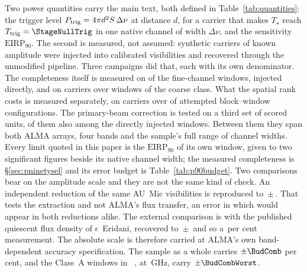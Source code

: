 Two power quantities carry the main text, both defined in
Table~\ref{tab:quantities}: the trigger level $P_{\rm trig} = 4\pi
d^{2}S\,\Delta\nu$ at distance $d$, for a carrier that makes $T_\star$ reach
$T_{\rm trig}=\StageNullTrig$ in one native channel of width $\Delta\nu$,
and the sensitivity $\mathrm{EIRP}_{90}$. The second is measured, not
assumed: synthetic carriers of known amplitude were injected into
calibrated visibilities and recovered through the unmodified pipeline.
Three campaigns did that, each with its own denominator. The completeness
itself is measured on
\MkInjCompWin{} of the \MkInjCompDenom{} fine-channel windows, injected
directly, and on \SensNToneCoarse{} carriers over \SensNInjCoarse{} windows
of the coarse class. What the spatial rank costs is measured separately, on
\SelNTone{} carriers over \MkInjSelUnit{} of \MkInjSelTotal{} attempted
block--window configurations. The primary-beam correction is tested on a
third set of \MkInjBeamUnit{} scored units, \MkInjBeamShared{} of them also
among the directly injected windows. Between them they span both ALMA
arrays, four bands and the sample's full range of
channel widths. Every limit quoted in
this paper is the $\mathrm{EIRP}_{90}$ of its own window, given to two
significant figures beside its native channel width; the measured
completeness is \S\ref{sec:pninetysel} and its error
budget is Table~\ref{tab:p90budget}. Two comparisons bear on the amplitude
scale and they are not the same kind of check. An independent reduction of the same AU~Mic visibilities is reproduced to
\PxJanRatio\,$\pm$\,\PxJanRatioErr. That tests the extraction and not
ALMA's flux transfer, an error in which would appear in both reductions
alike. The external comparison is with the published quiescent flux density
of $\epsilon$~Eridani, recovered to
\PxEpsRatio\,$\pm$\,\PxEpsRatioErr{} \citep{Burton2022} and so a
\SbEpsPct\,per cent measurement. The absolute scale is therefore carried at ALMA's own band-dependent
accuracy specification. The sample as a whole carries $\pm\BudComb$ per
cent, and the \BudNHiWin{} Class~A windows in
\BudHiBandWord~\BudHiBands, at \BudHiGHzList\,GHz, carry
$\pm\BudCombWorst$.

